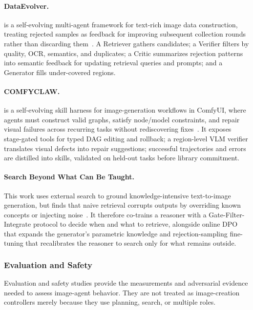 \paragraph{DataEvolver.}
 is a self-evolving multi-agent framework for text-rich image data construction, treating rejected samples as feedback for improving subsequent collection rounds rather than discarding them~\cite{avg260631537}. A Retriever gathers candidates; a Verifier filters by quality, OCR, semantics, and duplicates; a Critic summarizes rejection patterns into semantic feedback for updating retrieval queries and prompts; and a Generator fills under-covered regions.

\paragraph{COMFYCLAW.}
 is a self-evolving skill harness for image-generation workflows in ComfyUI, where agents must construct valid graphs, satisfy node/model constraints, and repair visual failures across recurring tasks without rediscovering fixes~\cite{avg260701709}. It exposes stage-gated tools for typed DAG editing and rollback; a region-level VLM verifier translates visual defects into repair suggestions; successful trajectories and errors are distilled into skills, validated on held-out tasks before library commitment. 

\paragraph{Search Beyond What Can Be Taught.}
This work uses external search to ground knowledge-intensive text-to-image generation, but finds that naive retrieval corrupts outputs by overriding known concepts or injecting noise~\cite{wang2026searchgen}. It therefore co-trains a reasoner with a Gate-Filter-Integrate protocol to decide when and what to retrieve, alongside online DPO that expands the generator's parametric knowledge and rejection-sampling fine-tuning that recalibrates the reasoner to search only for what remains outside. 



\subsubsection{Evaluation and Safety}
Evaluation and safety studies provide the measurements and adversarial evidence needed to assess image-agent behavior. They are not treated as image-creation controllers merely because they use planning, search, or multiple roles.

